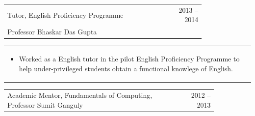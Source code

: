 \documentclass[a4paper]{article} %
\newcommand{\cproject}[5]{
    \begin{tabular}{p{0.80\linewidth}r}
        \textcolor{NavyBlue}{\small #2} & \multicolumn{1}{m{4cm}}{\raggedleft \small {\textsc{#1}}}\\
        \small {#3} & \small {#4}
    \end{tabular}
    \begin{tabular}{p{\linewidth}}
    \vspace{-0.3cm}
        \footnotesize {#5}
    \end{tabular}
    \vspace{-0.5cm}
}
\newcommand{\skill}[2]{
    \begin{tabular}{p{0.85\linewidth}r}
        \small {#2} & \multicolumn{1}{m{3cm}}{\raggedleft \textsc{\small #1}}\\
    \end{tabular}
    \vspace{-0.5cm}
}
\begin{document}
\cproject {2013 -- 2014}
          {Tutor, English Proficiency Programme}
          {Professor Bhaskar Das Gupta}
          {}
          {
               \begin{itemize}[leftmargin=0.5cm]
                   \item Worked as a English tutor in the pilot English Proficiency Programme to help
                       under-privileged students obtain a functional knowlege of English.
               \end{itemize}
          }

\skill {2012 -- 2013}
       {Academic Mentor, Fundamentals of Computing, Professor Sumit Ganguly}
\end{document}
